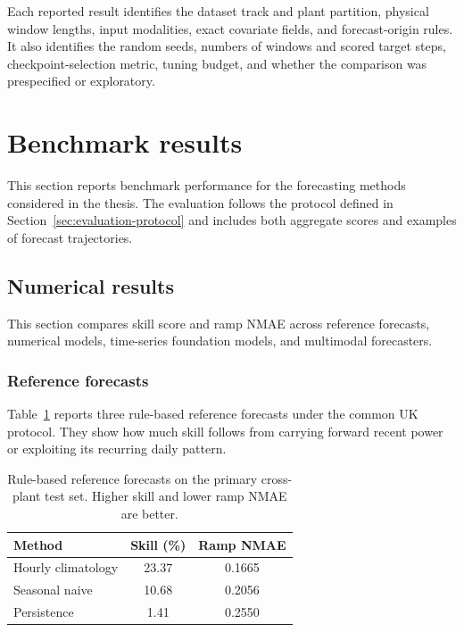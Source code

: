 Each reported result identifies the dataset track and plant partition, physical window lengths, input modalities, exact covariate fields, and forecast-origin rules. It also identifies the random seeds, numbers of windows and scored target steps, checkpoint-selection metric, tuning budget, and whether the comparison was prespecified or exploratory.

\section{Benchmark results}
\label{cha:results}

This section reports benchmark performance for the forecasting methods considered in the thesis. The evaluation follows the protocol defined in Section~\ref{sec:evaluation-protocol} and includes both aggregate scores and examples of forecast trajectories.

\subsection{Numerical results}

This section compares skill score and ramp NMAE across reference forecasts, numerical models, time-series foundation models, and multimodal forecasters.

\subsubsection{Reference forecasts}

Table~\ref{tab:results-reference} reports three rule-based reference forecasts under the common UK protocol. They show how much skill follows from carrying forward recent power or exploiting its recurring daily pattern.

\begin{table}[htbp]\centering
\begin{tabular}{lcc}\hline
Method & Skill (\%) & Ramp NMAE \\\hline
Hourly climatology & 23.37 & 0.1665 \\
Seasonal naive & 10.68 & 0.2056 \\
Persistence & 1.41 & 0.2550 \\\hline
\end{tabular}
\caption{Rule-based reference forecasts on the primary cross-plant test set. Higher skill and lower ramp NMAE are better.}\label{tab:results-reference}
\end{table}

